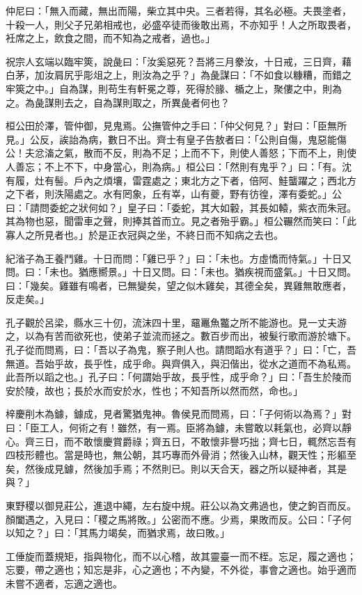 \begin{pinyinscope}
仲尼曰：「無入而藏，無出而陽，柴立其中央。三者若得，其名必極。夫畏塗者，十殺一人，則父子兄弟相戒也，必盛卒徒而後敢出焉，不亦知乎！人之所取畏者，衽席之上，飲食之間，而不知為之戒者，過也。」

祝宗人玄端以臨牢筴，說彘曰：「汝奚惡死？吾將三月豢汝，十日戒，三日齊，藉白茅，加汝肩尻乎彫俎之上，則汝為之乎？」為彘謀曰：「不如食以糠糟，而錯之牢筴之中。」自為謀，則苟生有軒冕之尊，死得於腞、楯之上，聚僂之中，則為之。為彘謀則去之，自為謀則取之，所異彘者何也？

桓公田於澤，管仲御，見鬼焉。公撫管仲之手曰：「仲父何見？」對曰：「臣無所見。」公反，誒詒為病，數日不出。齊士有皇子告敖者曰：「公則自傷，鬼惡能傷公！夫忿滀之氣，散而不反，則為不足；上而不下，則使人善怒；下而不上，則使人善忘；不上不下，中身當心，則為病。」桓公曰：「然則有鬼乎？」曰：「有。沈有履，灶有髻。戶內之煩壤，雷霆處之；東北方之下者，倍阿、鮭蠪躍之；西北方之下者，則泆陽處之。水有罔象，丘有峷，山有夔，野有彷徨，澤有委蛇。」公曰：「請問委蛇之狀何如？」皇子曰：「委蛇，其大如轂，其長如轅，紫衣而朱冠。其為物也惡，聞雷車之聲，則捧其首而立。見之者殆乎霸。」桓公囅然而笑曰：「此寡人之所見者也。」於是正衣冠與之坐，不終日而不知病之去也。

紀渻子為王養鬥雞。十日而問：「雞已乎？」曰：「未也。方虛憍而恃氣。」十日又問。曰：「未也。猶應嚮景。」十日又問。曰：「未也。猶疾視而盛氣。」十日又問。曰：「幾矣。雞雖有鳴者，已無變矣，望之似木雞矣，其德全矣，異雞無敢應者，反走矣。」

孔子觀於呂梁，縣水三十仞，流沫四十里，黿鼉魚龞之所不能游也。見一丈夫游之，以為有苦而欲死也，使弟子並流而拯之。數百步而出，被髮行歌而游於塘下。孔子從而問焉，曰：「吾以子為鬼，察子則人也。請問蹈水有道乎？」曰：「亡，吾無道。吾始乎故，長乎性，成乎命。與齊俱入，與汩偕出，從水之道而不為私焉。此吾所以蹈之也。」孔子曰：「何謂始乎故，長乎性，成乎命？」曰：「吾生於陵而安於陵，故也；長於水而安於水，性也；不知吾所以然而然，命也。」

梓慶削木為鐻，鐻成，見者驚猶鬼神。魯侯見而問焉，曰：「子何術以為焉？」對曰：「臣工人，何術之有！雖然，有一焉。臣將為鐻，未嘗敢以耗氣也，必齊以靜心。齊三日，而不敢懷慶賞爵祿；齊五日，不敢懷非譽巧拙；齊七日，輒然忘吾有四枝形體也。當是時也，無公朝，其巧專而外骨消；然後入山林，觀天性；形軀至矣，然後成見鐻，然後加手焉；不然則已。則以天合天，器之所以疑神者，其是與？」

東野稷以御見莊公，進退中繩，左右旋中規。莊公以為文弗過也，使之鉤百而反。顏闔遇之，入見曰：「稷之馬將敗。」公密而不應。少焉，果敗而反。公曰：「子何以知之？」曰：「其馬力竭矣，而猶求焉，故曰敗。」

工倕旋而蓋規矩，指與物化，而不以心稽，故其靈臺一而不桎。忘足，履之適也；忘要，帶之適也；知忘是非，心之適也；不內變，不外從，事會之適也。始乎適而未嘗不適者，忘適之適也。


\end{pinyinscope}
